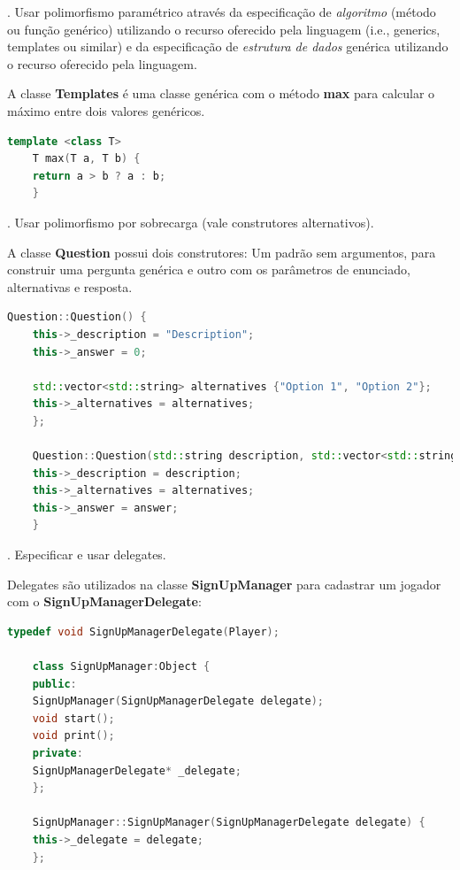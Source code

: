 \documentclass[rel_mlp]{iiufrgs}
\begin{document}
\begin{itemize}
	. Usar polimorfismo paramétrico
	através da especificação de \textit{algoritmo} (método ou função genérico) utilizando o recurso oferecido pela linguagem (i.e., generics, templates ou similar)
	e da especificação de \textit{estrutura de dados} genérica utilizando o recurso oferecido pela linguagem.
	
	A classe \textbf{Templates} é uma classe genérica com o método \textbf{max} para calcular o máximo entre dois valores genéricos.
	
	\begin{lstlisting}[language=C++, caption={Polimorfismo paramétrico}]
	template <class T>
	T max(T a, T b) {
	return a > b ? a : b;
	}
	\end{lstlisting}
	
	. Usar polimorfismo por sobrecarga (vale construtores alternativos).
	
	A classe \textbf{Question} possui dois construtores: Um padrão sem argumentos, para construir uma pergunta genérica e outro com os parâmetros de enunciado, alternativas e resposta.
	
	\begin{lstlisting}[language=C++, caption={Construtores da classe Question}]
	Question::Question() {
	this->_description = "Description";
	this->_answer = 0;
	
	std::vector<std::string> alternatives {"Option 1", "Option 2"};
	this->_alternatives = alternatives;
	};
	
	Question::Question(std::string description, std::vector<std::string> alternatives, int answer) {
	this->_description = description;
	this->_alternatives = alternatives;
	this->_answer = answer;
	}
	\end{lstlisting}
	
	. Especificar e usar delegates.
	
	Delegates são utilizados na classe \textbf{SignUpManager} para cadastrar um jogador com o \textbf{SignUpManagerDelegate}:
	
	\begin{lstlisting}[language=C++, caption={Uso de delegate}]
	typedef void SignUpManagerDelegate(Player);
	
	class SignUpManager:Object {
	public:
	SignUpManager(SignUpManagerDelegate delegate);
	void start();
	void print();
	private:
	SignUpManagerDelegate* _delegate;
	};
	
	SignUpManager::SignUpManager(SignUpManagerDelegate delegate) {
	this->_delegate = delegate;
	};
	

\end{lstlisting}
\end{itemize}
\end{document}
